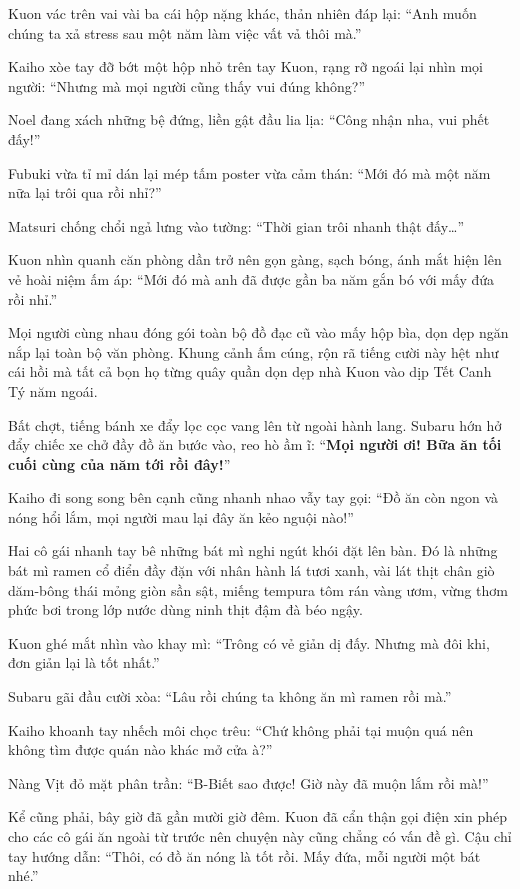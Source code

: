 \documentclass[../main.tex]{subfiles}
\begin{document}
Kuon vác trên vai vài ba cái hộp nặng khác, thản nhiên đáp lại: ``Anh muốn chúng ta xả stress sau một năm làm việc vất vả thôi mà.''

Kaiho xòe tay đỡ bớt một hộp nhỏ trên tay Kuon, rạng rỡ ngoái lại nhìn mọi người: ``Nhưng mà mọi người cũng thấy vui đúng không?''

Noel đang xách những bệ đứng, liền gật đầu lia lịa: ``Công nhận nha, vui phết đấy!''

Fubuki vừa tỉ mỉ dán lại mép tấm poster vừa cảm thán: ``Mới đó mà một năm nữa lại trôi qua rồi nhỉ?''

Matsuri chống chổi ngả lưng vào tường: ``Thời gian trôi nhanh thật đấy\dots''

Kuon nhìn quanh căn phòng dần trở nên gọn gàng, sạch bóng, ánh mắt hiện lên vẻ hoài niệm ấm áp: ``Mới đó mà anh đã được gần ba năm gắn bó với mấy đứa rồi nhỉ.''

Mọi người cùng nhau đóng gói toàn bộ đồ đạc cũ vào mấy hộp bìa, dọn dẹp ngăn nắp lại toàn bộ văn phòng. Khung cảnh ấm cúng, rộn rã tiếng cười này hệt như cái hồi mà tất cả bọn họ từng quây quần dọn dẹp nhà Kuon vào dịp Tết Canh Tý năm ngoái.

Bất chợt, tiếng bánh xe đẩy lọc cọc vang lên từ ngoài hành lang. Subaru hớn hở đẩy chiếc xe chở đầy đồ ăn bước vào, reo hò ầm ĩ: ``\textbf{Mọi người ơi! Bữa ăn tối cuối cùng của năm tới rồi đây!}''


Kaiho đi song song bên cạnh cũng nhanh nhao vẫy tay gọi: ``Đồ ăn còn ngon và nóng hổi lắm, mọi người mau lại đây ăn kẻo nguội nào!''

Hai cô gái nhanh tay bê những bát mì nghi ngút khói đặt lên bàn. Đó là những bát mì ramen cổ điển đầy đặn với nhân hành lá tươi xanh, vài lát thịt chân giò dăm-bông thái mỏng giòn sần sật, miếng tempura tôm rán vàng ươm, vừng thơm phức bơi trong lớp nước dùng ninh thịt đậm đà béo ngậy.


Kuon ghé mắt nhìn vào khay mì: ``Trông có vẻ giản dị đấy. Nhưng mà đôi khi, đơn giản lại là tốt nhất.''

Subaru gãi đầu cười xòa: ``Lâu rồi chúng ta không ăn mì ramen rồi mà.''

Kaiho khoanh tay nhếch môi chọc trêu: ``Chứ không phải tại muộn quá nên không tìm được quán nào khác mở cửa à?''

Nàng Vịt đỏ mặt phân trần: ``B-Biết sao được! Giờ này đã muộn lắm rồi mà!''

Kể cũng phải, bây giờ đã gần mười giờ đêm. Kuon đã cẩn thận gọi điện xin phép cho các cô gái ăn ngoài từ trước nên chuyện này cũng chẳng có vấn đề gì. Cậu chỉ tay hướng dẫn: ``Thôi, có đồ ăn nóng là tốt rồi. Mấy đứa, mỗi người một bát nhé.''
\end{document}

